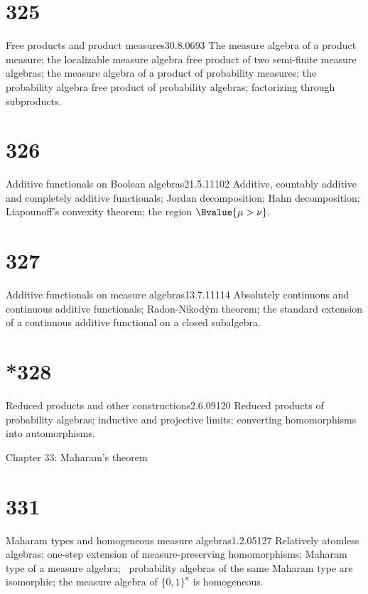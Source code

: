 \section{325}{Free products and product measures}{30.8.06}{93}{}
{The measure algebra of a product measure;  the
localizable measure algebra free product of two semi-finite measure
algebras;  the measure algebra of a product of probability measures;
the probability algebra free product of probability algebras;
factorizing through subproducts.}
     
\section{326}{Additive functionals on Boolean algebras}{21.5.11}{102}{}
{Additive, countably additive and completely additive functionals;
Jordan decomposition;  Hahn decomposition;  Liapounoff's convexity 
theorem;  the region $\Bvalue{\mu>\nu}$.}
     
\section{327}{Additive functionals on measure algebras}{13.7.11}{114}{}
{Absolutely continuous and continuous additive functionals;
Radon-Nikod\'ym theorem;  the standard extension of a continuous
additive functional on a closed subalgebra.}

\section{*328}{Reduced products and other constructions}{2.6.09}{120}{}
{Reduced products of probability algebras;  inductive and projective
limits;  converting homomorphisms into automorphisms.}
     
     
 Chapter 33:  Maharam's theorem
     
     
\section{331}{Maharam types and homogeneous measure 
algebras}{1.2.05}{127}{}
{Relatively atomless algebras;  one-step extension of
measure-preserving homomorphisms;  Maharam type of a measure algebra;
\Mth\ probability algebras of the same Maharam type are
isomorphic;  the measure algebra of $\{0,1\}^{\kappa}$ is homogeneous.}
     
